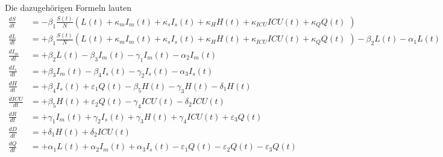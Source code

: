 \documentclass[twoside]{article}
\begin{document}
Die dazugeh\"origen Formeln lauten 
\begin{align*}
\frac{d S}{dt} &= -\beta_1 \frac{S(t)}{N}\left( L(t) + \kappa_m I_m(t)+ \kappa_s I_s(t) + \kappa_H H(t) + \kappa_{ICU} ICU(t) + \kappa_Q Q(t)\phantom{\frac{.}{.}}\right)\\
%
\frac{d L}{dt} &= +\beta_1 \frac{S(t)}{N}\left( L(t) + \kappa_m I_m(t)+ \kappa_s I_s(t) + \kappa_H H(t) + \kappa_{ICU} ICU(t) + \kappa_Q Q(t)\phantom{\frac{.}{.}}\right) - \beta_2 L(t) - \alpha_1 L(t)\\
%
\frac{d I_m}{dt} &= +\beta_2 L(t) - \beta_3 I_m(t)- \gamma_1 I_m(t)-\alpha_2 I_m(t)\\
%
\frac{d I_s}{dt} &= +\beta_3 I_m(t) - \beta_4 I_s(t) - \gamma_2 I_s(t) - \alpha_3 I_s(t) \\
%
\frac{d H}{dt} &= +\beta_4 I_s(t) + \varepsilon_1 Q(t) - \beta_5 H(t) - \gamma_3 H(t) - \delta_1 H(t)\\
%
\frac{d ICU}{dt} &= +\beta_5 H(t) + \varepsilon_2 Q(t) - \gamma_4 ICU(t) - \delta_2 ICU(t)\\
%
\frac{d R}{dt} &= +\gamma_1 I_m(t)+\gamma_2 I_s(t)+\gamma_3 H(t) +\gamma_4 ICU(t) +\varepsilon_3 Q(t) \\
\frac{d D}{dt} &= +\delta_1 H(t) + \delta_2 ICU(t)\\
%
\frac{d Q}{dt} &= +\alpha_1 L(t) + \alpha_2 I_m(t) + \alpha_3 I_s(t) - \varepsilon_1 Q(t)- \varepsilon_2 Q(t)- \varepsilon_3 Q(t)
%
\end{align*}
\end{document}
